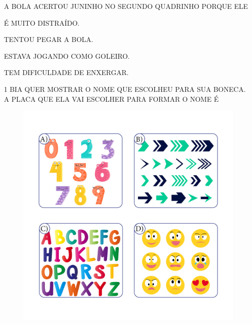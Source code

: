 
A BOLA ACERTOU JUNINHO NO SEGUNDO QUADRINHO PORQUE ELE

\begin{escolha}
\item É MUITO DISTRAÍDO.

\item TENTOU PEGAR A BOLA. 

\item ESTAVA JOGANDO COMO GOLEIRO.

\item TEM DIFICULDADE DE ENXERGAR.
\end{escolha}




\pagebreak

\num{1} BIA QUER MOSTRAR O NOME QUE ESCOLHEU PARA SUA BONECA.
A PLACA QUE ELA VAI ESCOLHER PARA FORMAR O NOME É

\begin{figure}[H]
\includegraphics[width=\textwidth]{media/image239a242.png}
\end{figure}

